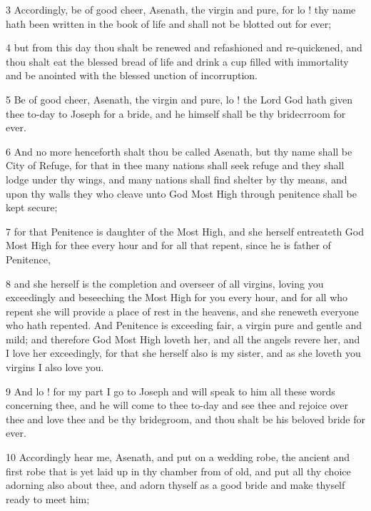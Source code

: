 \par 3 Accordingly, be of good cheer, Asenath, the virgin and pure, for lo ! thy name hath been written in the book of life and shall not be blotted out for ever; 

\par 4 but from this day thou shalt be renewed and refashioned and re-quickened, and thou shalt eat the blessed bread of life and drink a cup filled with immortality and be anointed with the blessed unction of incorruption. 

\par 5 Be of good cheer, Asenath, the virgin and pure, lo ! the Lord God hath given thee to-day to Joseph for a bride, and he himself shall be thy bridecrroom for ever. 

\par 6 And no more henceforth shalt thou be called Asenath, but thy name shall be City of Refuge, for that in thee many nations shall seek refuge and they shall lodge under thy wings, and many nations shall find shelter by thy means, and upon thy walls they who cleave unto God Most High through penitence shall be kept secure; 

\par 7 for that Penitence is daughter of the Most High, and she herself entreateth God Most High for thee every hour and for all that repent, since he is father of Penitence, 

\par 8 and she herself is the completion and overseer of all virgins, loving you exceedingly and beseeching the Most High for you every hour, and for all who repent she will provide a place of rest in the heavens, and she reneweth everyone who hath repented. And Penitence is exceeding fair, a virgin pure and gentle and mild; and therefore God Most High loveth her, and all the angels revere her, and I love her exceedingly, for that she herself also is my sister, and as she loveth you virgins I also love you. 

\par 9 And lo ! for my part I go to Joseph and will speak to him all these words concerning thee, and he will come to thee to-day and see thee and rejoice over thee and love thee and be thy bridegroom, and thou shalt be his beloved bride for ever. 

\par 10 Accordingly hear me, Asenath, and put on a wedding robe, the ancient and first robe that is yet laid up in thy chamber from of old, and put all thy choice adorning also about thee, and adorn thyself as a good bride and make thyself ready to meet him; 

